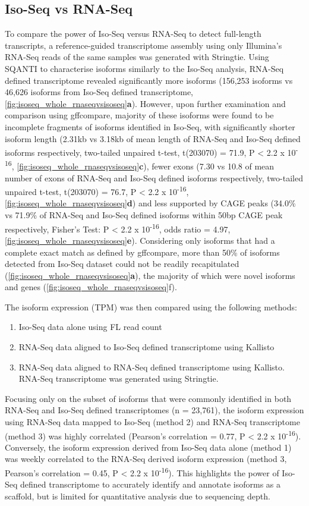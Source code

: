 \newpage
\subsection{Iso-Seq vs RNA-Seq} 
To compare the power of Iso-Seq versus RNA-Seq to detect full-length transcripts, a reference-guided transcriptome assembly using only Illumina's RNA-Seq reads of the same samples was generated with Stringtie. Using SQANTI to characterise isoforms similarly to the Iso-Seq analysis, RNA-Seq defined transcriptome revealed significantly more isoforms (156,253 isoforms vs 46,626 isoforms from Iso-Seq defined transcriptome, \cref{fig:isoseq_whole_rnaseqvsisoseq}\textbf{a}). However, upon further examination and comparison using gffcompare, majority of these isoforms were found to be incomplete fragments of isoforms identified in Iso-Seq, with significantly shorter isoform length (2.31kb vs 3.18kb of mean length of RNA-Seq and Iso-Seq defined isoforms respectively, two-tailed unpaired t-test, t(203070) = 71.9, P < 2.2 x 10\textsuperscript{-16}, \cref{fig:isoseq_whole_rnaseqvsisoseq}\textbf{c}), fewer exons (7.30 vs 10.8 of mean number of exons of RNA-Seq and Iso-Seq defined isoforms respectively, two-tailed unpaired t-test, t(203070) = 76.7, P < 2.2 x 10\textsuperscript{-16}, \cref{fig:isoseq_whole_rnaseqvsisoseq}\textbf{d}) and less supported by CAGE peaks (34.0\% vs 71.9\% of RNA-Seq and Iso-Seq defined isoforms within 50bp CAGE peak respectively, Fisher's Test: P < 2.2 x 10\textsuperscript{-16}, odds ratio = 4.97, \cref{fig:isoseq_whole_rnaseqvsisoseq}\textbf{e}). Considering only isoforms that had a complete exact match as defined by gffcompare, more than 50\% of isoforms detected from Iso-Seq dataset could not be readily recapitulated (\cref{fig:isoseq_whole_rnaseqvsisoseq}\textbf{a}), the majority of which were novel isoforms and genes (\cref{fig:isoseq_whole_rnaseqvsisoseq}f).      

The isoform expression (TPM) was then compared using the following methods: 
\begin{enumerate}
	\item Iso-Seq data alone using FL read count 
	\item RNA-Seq data aligned to Iso-Seq defined transcriptome using Kallisto\cite{Bray2016}
	\item RNA-Seq data aligned to RNA-Seq defined transcriptome using Kallisto\cite{Bray2016}. RNA-Seq transcriptome was generated using Stringtie. 	
\end{enumerate}

Focusing only on the subset of isoforms that were commonly identified in both RNA-Seq and Iso-Seq defined transcriptomes (n = 23,761), the isoform expression using RNA-Seq data mapped to Iso-Seq (method 2) and RNA-Seq transcriptome (method 3) was highly correlated (Pearson's correlation = 0.77, P < 2.2 x 10\textsuperscript{-16}). Conversely, the isoform expression derived from Iso-Seq data alone (method 1) was weekly correlated to the RNA-Seq derived isoform expression (method 3, Pearson's correlation = 0.45, P < 2.2 x 10\textsuperscript{-16}). This highlights the power of Iso-Seq defined transcriptome to accurately identify and annotate isoforms as a scaffold, but is limited for quantitative analysis due to sequencing depth.

